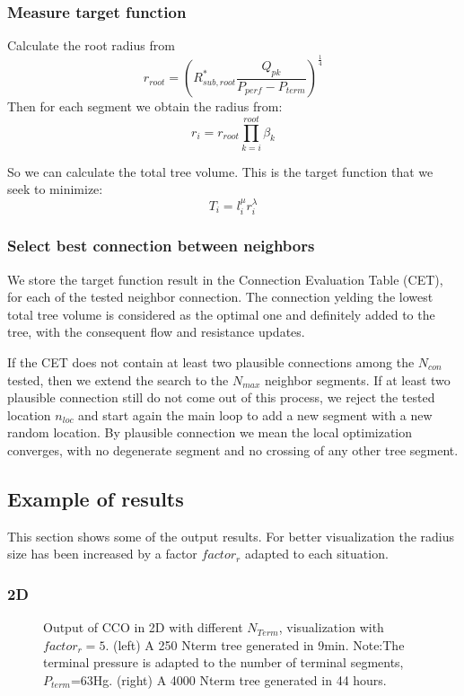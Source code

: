 \documentclass[a4paper, 11pt]{article} %
\begin{document}
\subsubsection{Measure target function}
\label{target}
Calculate the root radius from
\begin{equation}
r_{root} = \left( R_{sub, root}^* \frac{Q_{pk}}{P_{perf}-P_{term}}\right)^\frac{1}{4}
\end{equation}
Then for each segment we obtain the radius from:
\begin{equation}
r_i = r_{root} \prod\limits_{k=i}^{root} \beta_k
\end{equation}

So we can calculate the total tree volume. This is the target function that we seek to minimize:
\begin{equation}
T_i = l_i^{\mu} r_i^{\lambda}
\end{equation}

 

\subsubsection{Select best connection between neighbors}
We store the target function result in the Connection Evaluation Table (CET), for each of the tested neighbor connection. The connection yelding the lowest total tree volume is considered as the optimal one and definitely added to the tree, with the consequent flow and resistance updates.

If the CET does not contain at least two plausible connections among the $N_{con}$ tested, then we extend the search to the $N_{max}$ neighbor segments. If at least two plausible connection still do not come out of this process, we reject the tested location $n_{loc}$ and start again the main loop to add a new segment with a new random location.
By plausible connection we mean the local optimization converges, with no degenerate segment and no crossing of any other tree segment. 


\subsection{Example of results}
This section shows some of the output results. For better visualization the radius size has been increased by a factor $factor_r$ adapted to each situation.
\subsubsection{2D}
\begin{figure}[!h]
\centering
\caption{Output of CCO in 2D with different $N_{Term}$, visualization with $ factor_r = 5 $. (left) A 250 Nterm tree generated in \unit{9}{min}. Note:The terminal pressure is adapted to the number of terminal segments, $P_{term}$=\unit{63}{\milli\meter}Hg. (right) A 4000 Nterm tree generated in 44 hours.}

\label{fig:CCO 2D}
\end{figure}
\end{document}
